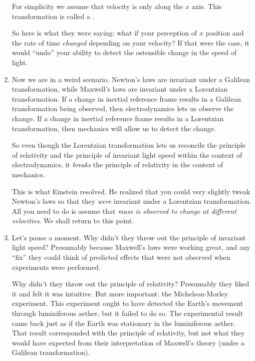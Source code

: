 \begin{enumerate}
  For simplicity we assume that velocity is only along the $x$ axis.
  This transformation is called a .

  So here is what they were saying: what if your perception of $x$
  position and the rate of time \emph{changed} depending on your
  velocity? If that were the case, it would ``undo'' your ability to
  detect the ostensible change in the speed of light.

  \item Now we are in a weird scenario. Newton's laws are invariant
  under a Galilean transformation, while Maxwell's laws are invariant
  under a Lorentzian transformation. If a change in inertial reference
  frame results in a Galilean transformation being observed, then
  electrodynamics lets us observe the change. If a change in inertial
  reference frame results in a Lorentzian transformation, then mechanics
  will allow us to detect the change.

  So even though the Lorentzian transformation lets us reconcile the
  principle of relativity and the principle of invariant light speed
  within the context of electrodynamics, it \emph{breaks} the principle
  of relativity in the context of mechanics.

  This is what Einstein resolved. He realized that you could very
  slightly tweak Newton's laws so that they \emph{were} invariant under
  a Lorentzian transformation. All you need to do is assume that
  \emph{mass is observed to change at different velocities}. We shall
  return to this point.

  \item Let's pause a moment. Why didn't they throw out the principle of
  invariant light speed? Presumably because Maxwell's laws were working
  great, and any ``fix'' they could think of predicted effects that were
  not observed when experiments were performed.

  Why didn't they throw out the principle of relativity? Presumably they
  liked it and felt it was intuitive. But more important: the
  Michelson-Morley experiment. This experiment ought to have detected
  the Earth's movement through luminiferous aether, but it failed to do
  so. The experimental result came back just as if the Earth was
  stationary in the luminiferous aether. That result corresponded with
  the principle of relativity, but not what they would have expected
  from their interpretation of Maxwell's theory (under a Galilean
  transformation).


\end{enumerate}

